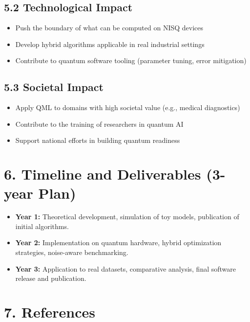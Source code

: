 \documentclass[11pt]{article}
\begin{document}
\subsection*{5.2 Technological Impact}
\begin{itemize}
    \item Push the boundary of what can be computed on NISQ devices
    \item Develop hybrid algorithms applicable in real industrial settings
    \item Contribute to quantum software tooling (parameter tuning, error mitigation)
\end{itemize}

\subsection*{5.3 Societal Impact}
\begin{itemize}
    \item Apply QML to domains with high societal value (e.g., medical diagnostics)
    \item Contribute to the training of researchers in quantum AI
    \item Support national efforts in building quantum readiness
\end{itemize}

\section*{6. Timeline and Deliverables (3-year Plan)}

\begin{itemize}
    \item \textbf{Year 1:} Theoretical development, simulation of toy models, publication of initial algorithms.
    \item \textbf{Year 2:} Implementation on quantum hardware, hybrid optimization strategies, noise-aware benchmarking.
    \item \textbf{Year 3:} Application to real datasets, comparative analysis, final software release and publication.
\end{itemize}

\section*{7. References}
\end{document}
